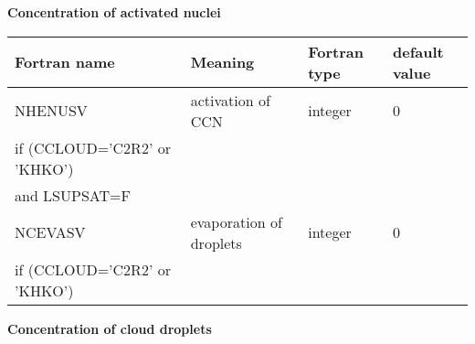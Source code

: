 \textbf{Concentration of activated nuclei}
\begin{longtable} {|p{}|p{}|>{\centering}p{}|p{}<{\centering}|}
\hline
Fortran name & Meaning & Fortran type & default value \\
\hline \hline
\endhead
NHENUSV & activation of CCN & integer & 0 \\ \nopagebreak
if (CCLOUD='C2R2' or 'KHKO') &&&\\ \nopagebreak
and LSUPSAT=F &&&\\\hline
NCEVASV & evaporation of droplets & integer & 0 \\ \nopagebreak
if (CCLOUD='C2R2' or 'KHKO') &&&\\\hline
\end{longtable}

\textbf{Concentration of cloud droplets}
